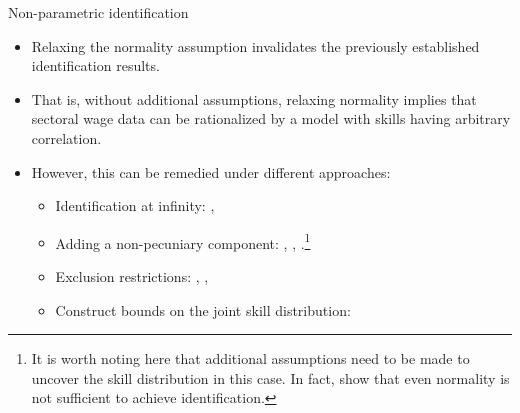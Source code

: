 \documentclass{beamer}
\begin{document}
	\begin{frame}{Non-parametric identification}
		\begin{itemize}
			\item Relaxing the normality assumption invalidates the previously established identification results. \citep{heckman1990empirical}
			\smallskip
			\item That is, without additional assumptions, relaxing normality implies that sectoral wage data can be rationalized by a model with skills having arbitrary correlation.
			\smallskip
			\item However, this can be remedied under different approaches:
			\begin{itemize}
				\smallskip
				\item Identification at infinity: \citet{heckman1990empirical} \citet{french2011identification}, \citet{d2013another}
				\smallskip
				\item Adding a non-pecuniary component: \citet{heckman2007econometric} \citet{d2013inference}, \citet{bayer2011nonparametric}, \citet{lee2023nonparametric}.\footnote{It is worth noting here that additional assumptions need to be made to uncover the skill distribution in this case. In fact, \citet{french2011identification} show that even normality is not sufficient to achieve identification.}
				\smallskip
				\item Exclusion restrictions: \citet{heckman1990empirical}, \citet{buera2006non}, \citet{french2011identification}
				\smallskip
				\item Construct bounds on the joint skill distribution:  \citet{mourifie2020sharp}
			\end{itemize}
		\end{itemize}
	\end{frame}
	
\end{document}

